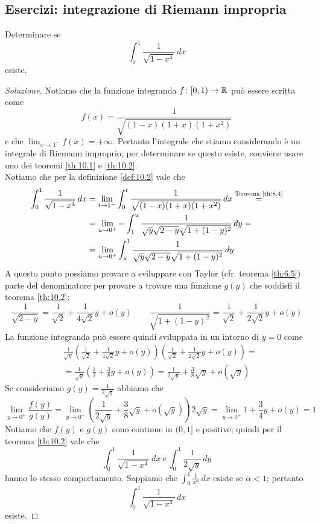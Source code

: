 \subsection{Esercizi: integrazione di Riemann impropria}
\begin{exercise}
    \label{ex:10.1}
    Determinare se
    \[
    \int_0^1 \frac{1}{\sqrt{1-x^4}}\, dx
    \]
    esiste.
\end{exercise}
\begin{proof}[Soluzione]
    Notiamo che la funzione integranda $f\colon[0,1)\to\amsbb{R}$ può essere scritta come
    \[
    f(x) = \frac{1}{\sqrt{(1-x)(1+x)(1+x^2)}}
    \]
    e che $\lim_{x\to 1^-} f(x) = +\infty$. Pertanto l'integrale che stiamo considerando è un integrale di Riemann improprio; per determinare se questo esiste, conviene usare uno dei teoremi \ref{th:10.1} e \ref{th:10.2}.\\
    Notiamo che per la definizione \ref{def:10.2} vale che
    \[
    \begin{split}
        \int_0^1 \frac{1}{\sqrt{1-x^4}}\, dx &= \lim_{t\to1^-} \int_0^t \frac{1}{\sqrt{(1-x)(1+x)(1+x^2)}}\, dx \overset{\text{Teorema \ref{th:8.4}}}{=} \\
        &=\lim_{u\to0^+} -\int_1^u \frac{1}{\sqrt{y}\sqrt{2-y}\sqrt{1+(1-y)^2}}\, dy = \\
        & = \lim_{u\to 0^+}\int_u^1 \frac{1}{\sqrt{y}\sqrt{2-y}\sqrt{1+(1-y)^2}}\, dy
    \end{split}
    \]
    A questo punto possiamo provare a sviluppare con Taylor (cfr. teorema \ref{th:6.5}) parte del denominatore per provare a trovare una funzione $g(y)$ che soddisfi il teorema \ref{th:10.2}:
    \[
    \frac{1}{\sqrt{2-y}} = \frac{1}{\sqrt{2}}+\frac{1}{4\sqrt{2}}y +o(y) \qquad \frac{1}{\sqrt{1+(1-y)^2}} = \frac{1}{\sqrt{2}}+\frac{1}{2\sqrt{2}}y +o(y)
    \]
    La funzione integranda può essere quindi sviluppata in un intorno di $y=0$ come
    \[
    \begin{split}
        & \frac{1}{\sqrt{y}}\left(\frac{1}{\sqrt{2}}+\frac{1}{4\sqrt{2}}y+o(y)\right)\left(\frac{1}{\sqrt{2}}+\frac{1}{2\sqrt{2}}y+o(y)\right) = \\
        & = \frac{1}{\sqrt{y}}\left(\frac{1}{2}+\frac{3}{8}y+o(y)\right) = \frac{1}{2\sqrt{y}}+\frac{3}{8}\sqrt{y}+o(\sqrt{y})
    \end{split}
    \]
    Se consideriamo $g(y) = \frac{1}{2\sqrt{y}}$ abbiamo che
    \[
    \lim_{y\to 0^+} \frac{f(y)}{g(y)} = \lim_{y\to 0^+} \left(\frac{1}{2\sqrt{y}}+\frac{3}{8}\sqrt{y}+o(\sqrt{y})\right)2\sqrt{y} = \lim_{y\to 0^+} 1 +\frac{3}{4}y+o(y) = 1
    \]
    Notiamo che $f(y)$ e $g(y)$ sono continue in $(0,1]$ e positive; quindi per il teorema \ref{th:10.2} vale che
    \[
    \int_0^1 \frac{1}{\sqrt{1-x^4}}\, dx \ \text{e} \ \int_0^1 \frac{1}{2\sqrt{y}}\, dy
    \]
    hanno lo stesso comportamento. Sappiamo che $\int_0^1 \frac{1}{x^\alpha}\, dx$ esiste se $\alpha<1$; pertanto 
    \[
    \int_0^1 \frac{1}{\sqrt{1-x^4}}\, dx
    \]
    esiste.
\end{proof}
